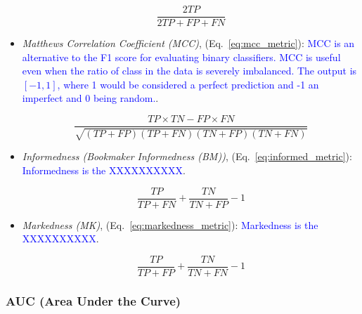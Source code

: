 \begin{itemize}[noitemsep,topsep=0pt]


\begin{equation}
{\frac{2TP}{2TP+FP+FN}}
\label{eq:f1_metric}
\end{equation}

\item \textit{Matthews Correlation Coefficient (MCC)}, (Eq.~\ref{eq:mcc_metric}): \textcolor{blue}{MCC is  an alternative to the F1 score for evaluating binary classifiers. MCC is useful even when the ratio of class in the data is severely imbalanced. The output is $[-1,1]$, where 1 would be considered a perfect prediction and -1 an imperfect and 0 being random.}.

\begin{equation}
{\frac{TP \times TN - FP \times FN}{\sqrt{(TP + FP)(TP + FN)(TN + FP)(TN + FN)}}}
\label{eq:mcc_metric}
\end{equation}

\item \textit{Informedness (Bookmaker Informedness (BM))}, (Eq.~\ref{eq:informed_metric}): \textcolor{blue}{Informedness is the XXXXXXXXXX}.

\begin{equation}
{\frac{TP}{TP+FN}+\frac{TN}{TN+FP}-1}
\label{eq:informed_metric}
\end{equation}

\item \textit{Markedness (MK)}, (Eq.~\ref{eq:markedness_metric}): \textcolor{blue}{Markedness is the XXXXXXXXXX}.

\begin{equation}
{\frac{TP}{TP+FP}+\frac{TN}{TN+FN}-1}
\label{eq:markedness_metric}
\end{equation}


\end{itemize}

\subsubsection{AUC (Area Under the Curve)}



